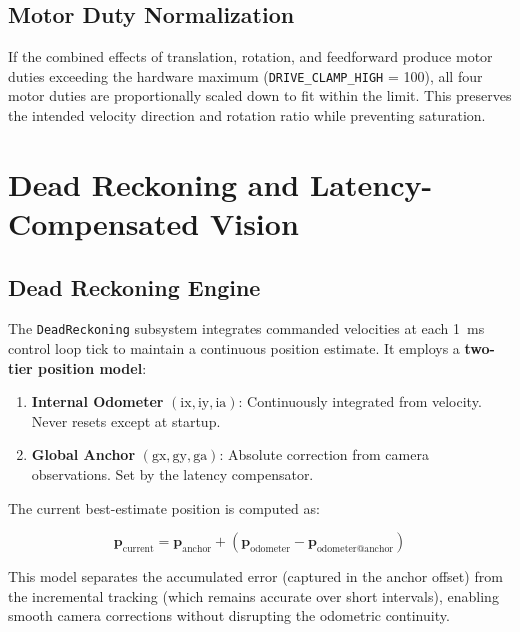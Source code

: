 \documentclass[12pt, a4paper, twoside]{article}
\begin{document}
\subsection{Motor Duty Normalization}

If the combined effects of translation, rotation, and feedforward produce motor duties exceeding the hardware maximum (\texttt{DRIVE\_CLAMP\_HIGH} = 100), all four motor duties are proportionally scaled down to fit within the limit. This preserves the intended velocity direction and rotation ratio while preventing saturation.

\section{Dead Reckoning and Latency-Compensated Vision}
\label{sec:dr}

\subsection{Dead Reckoning Engine}

The \texttt{DeadReckoning} subsystem integrates commanded velocities at each \SI{1}{\milli\second} control loop tick to maintain a continuous position estimate. It employs a \textbf{two-tier position model}:

\begin{enumerate}
    \item \textbf{Internal Odometer} $(\text{ix}, \text{iy}, \text{ia})$: Continuously integrated from velocity. Never resets except at startup.
    \item \textbf{Global Anchor} $(\text{gx}, \text{gy}, \text{ga})$: Absolute correction from camera observations. Set by the latency compensator.
\end{enumerate}

The current best-estimate position is computed as:

\begin{equation}
    \mathbf{p}_{\text{current}} = \mathbf{p}_{\text{anchor}} + (\mathbf{p}_{\text{odometer}} - \mathbf{p}_{\text{odometer@anchor}})
    \label{eq:dr-model}
\end{equation}

This model separates the accumulated error (captured in the anchor offset) from the incremental tracking (which remains accurate over short intervals), enabling smooth camera corrections without disrupting the odometric continuity.
\end{document}
